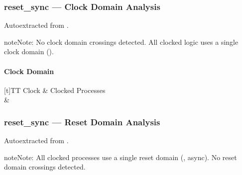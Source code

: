\documentclass[letterpaper,10pt,english]{sphinxmanual}
\begin{document}
\sphinxstepscope


\subsubsection{reset\_sync — Clock Domain Analysis}
\label{\detokenize{modules/reset_sync/cdc:reset-sync-clock-domain-analysis}}\label{\detokenize{modules/reset_sync/cdc::doc}}
\sphinxAtStartPar
Auto\sphinxhyphen{}extracted from .

\begin{sphinxadmonition}{note}{Note:}
\sphinxAtStartPar
No clock domain crossings detected. All clocked logic uses a single clock domain ().
\end{sphinxadmonition}


\paragraph{Clock Domain}
\label{\detokenize{modules/reset_sync/cdc:clock-domain}}

\begin{savenotes}\sphinxattablestart
\sphinxthistablewithglobalstyle
\centering
\begin{tabulary}{\linewidth}[t]{TT}
\sphinxtoprule
\sphinxstyletheadfamily 
\sphinxAtStartPar
Clock
&\sphinxstyletheadfamily 
\sphinxAtStartPar
Clocked Processes
\\
\sphinxmidrule
\sphinxtableatstartofbodyhook
\sphinxAtStartPar
{}
&
\sphinxAtStartPar
{}
\\
\sphinxbottomrule
\end{tabulary}
\sphinxtableafterendhook\par
\sphinxattableend\end{savenotes}

\sphinxstepscope


\subsubsection{reset\_sync — Reset Domain Analysis}
\label{\detokenize{modules/reset_sync/reset:reset-sync-reset-domain-analysis}}\label{\detokenize{modules/reset_sync/reset::doc}}
\sphinxAtStartPar
Auto\sphinxhyphen{}extracted from .

\begin{sphinxadmonition}{note}{Note:}
\sphinxAtStartPar
All clocked processes use a single reset domain (, async). No reset domain crossings detected.
\end{sphinxadmonition}
\end{document}
